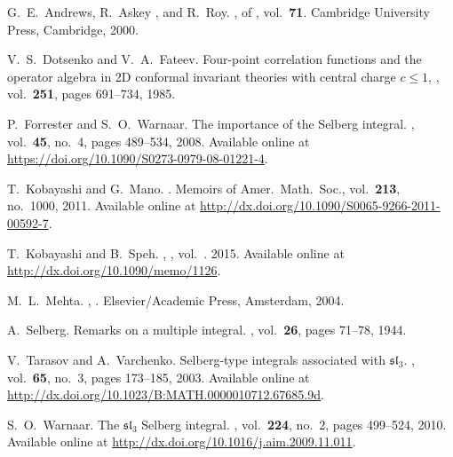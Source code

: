 \begin{thebibliography}{AAR00}
  G.~E.~Andrews, R.~Askey , and 
  R.~Roy.{\newblock} ,  of , vol.~\textbf{71}.{\newblock} Cambridge
  University Press, Cambridge, 2000.{\newblock}
  
  V.~S.~Dotsenko  and  V.~A.~Fateev.{\newblock}
  Four-point correlation functions and the operator algebra in 2D conformal
  invariant theories with central charge $c \leq 1$, , vol.~\textbf{251}, pages 691--734, 1985.{\newblock}
  
  P.~Forrester  and 
  S.~O.~Warnaar.{\newblock} The importance of the Selberg integral.{\newblock}
  , vol.~\textbf{45}, no.~4, pages 489--534,
  2008.{\newblock} Available online at
  \url{https://doi.org/10.1090/S0273-0979-08-01221-4}.{\newblock}
  
  T.~Kobayashi  and  G.~Mano.{\newblock}
  .{\newblock} Memoirs of Amer.~Math.~Soc., vol.~\textbf{213}, no.~1000, 2011.{\newblock} Available online at
  \url{http://dx.doi.org/10.1090/S0065-9266-2011-00592-7}.{\newblock}
  
  T.~Kobayashi  and  B.~Speh.{\newblock}
  , {\newblock} , vol.~\textbf{}. 2015.{\newblock} Available online at
  \url{http://dx.doi.org/10.1090/memo/1126}.{\newblock}
  
  M.~L.~Mehta.{\newblock} , .{\newblock} Elsevier/Academic Press, Amsterdam, 2004.{\newblock}
  
  
  A.~Selberg.{\newblock} Remarks on a multiple
  integral.{\newblock} , vol.~\textbf{26}, pages 71--78,
  1944.{\newblock}
  
  V.~Tarasov  and  A.~Varchenko.{\newblock}
  Selberg-type integrals associated with $\mathfrak{s}\mathfrak{l}_3$.{\newblock}
  , vol.~\textbf{65}, no.~3, pages 173--185,
  2003.{\newblock} Available online at
  \url{http://dx.doi.org/10.1023/B:MATH.0000010712.67685.9d}.{\newblock}
  
  S.~O.~Warnaar.{\newblock} The $\mathfrak{sl}_3$
  Selberg integral.{\newblock} , vol.~\textbf{224}, no.~2, pages
  499--524, 2010.{\newblock} Available online at
  \url{http://dx.doi.org/10.1016/j.aim.2009.11.011}.{\newblock}
\end{thebibliography}
